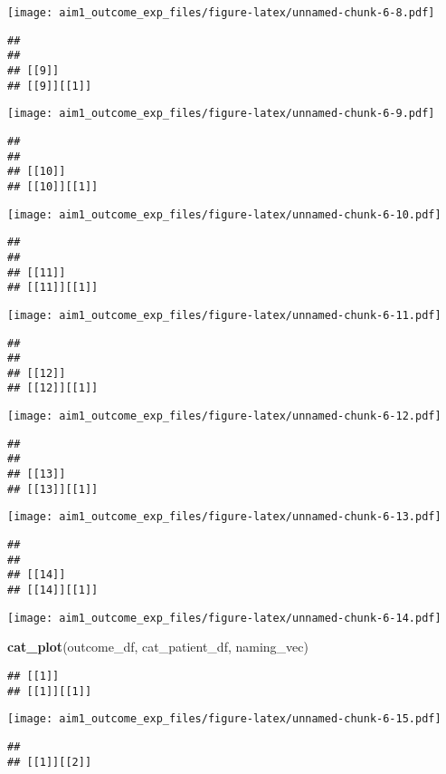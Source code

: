 \documentclass[
]{article}
\newenvironment{Shaded}{\begin{snugshade}}{\end{snugshade}}
\newcommand{\FunctionTok}[1]{\textcolor[rgb]{0.13,0.29,0.53}{\textbf{#1}}}
\newcommand{\NormalTok}[1]{#1}
\begin{document}
\texttt{[image: aim1\_outcome\_exp\_files/figure-latex/unnamed-chunk-6-8.pdf]}

\begin{verbatim}
## 
## 
## [[9]]
## [[9]][[1]]
\end{verbatim}

\texttt{[image: aim1\_outcome\_exp\_files/figure-latex/unnamed-chunk-6-9.pdf]}

\begin{verbatim}
## 
## 
## [[10]]
## [[10]][[1]]
\end{verbatim}

\texttt{[image: aim1\_outcome\_exp\_files/figure-latex/unnamed-chunk-6-10.pdf]}

\begin{verbatim}
## 
## 
## [[11]]
## [[11]][[1]]
\end{verbatim}

\texttt{[image: aim1\_outcome\_exp\_files/figure-latex/unnamed-chunk-6-11.pdf]}

\begin{verbatim}
## 
## 
## [[12]]
## [[12]][[1]]
\end{verbatim}

\texttt{[image: aim1\_outcome\_exp\_files/figure-latex/unnamed-chunk-6-12.pdf]}

\begin{verbatim}
## 
## 
## [[13]]
## [[13]][[1]]
\end{verbatim}

\texttt{[image: aim1\_outcome\_exp\_files/figure-latex/unnamed-chunk-6-13.pdf]}

\begin{verbatim}
## 
## 
## [[14]]
## [[14]][[1]]
\end{verbatim}

\texttt{[image: aim1\_outcome\_exp\_files/figure-latex/unnamed-chunk-6-14.pdf]}

\begin{Shaded}
\begin{Highlighting}[]
\FunctionTok{cat\_plot}\NormalTok{(outcome\_df, cat\_patient\_df, naming\_vec)}
\end{Highlighting}
\end{Shaded}

\begin{verbatim}
## [[1]]
## [[1]][[1]]
\end{verbatim}

\texttt{[image: aim1\_outcome\_exp\_files/figure-latex/unnamed-chunk-6-15.pdf]}

\begin{verbatim}
## 
## [[1]][[2]]
\end{verbatim}
\end{document}
